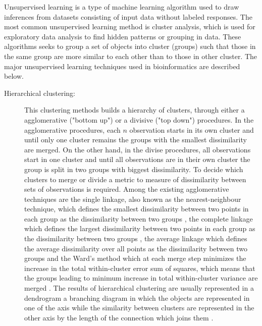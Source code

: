 Unsupervised learning is a type of machine learning algorithm used to draw inferences from datasets consisting of input data without labeled responses.
The most common unsupervised learning method is cluster analysis, which is used for exploratory data analysis to find hidden patterns or grouping in data. These algorithms seeks to group a set of objects into cluster (groups) such that those in the same group are more similar to each other than to those in other cluster.
The major unsupervised learning techniques used in bioinformatics are described below.
\begin{description}

\item[Hierarchical clustering:] {This clustering methods builds a hierarchy of clusters, through either a agglomerative ("bottom up") or a divisive ("top down") procedures.
In the agglomerative procedures, each $n$ observation starts in its own cluster and until only one cluster remains the groups with the smallest dissimilarity are merged.
On the other hand, in the divise procedures, all observations start in one cluster and until all observations are in their own cluster the group is split in two groups with biggest dissimilarity. To decide which clusters to merge or divide a metric to measure of dissimilarity between sets of observations is required.
Among the existing agglomerative techniques are the single linkage, also known as the nearest-neighbour technique, which defines the smallest dissimilarity between two points in each group as the dissimilarity between two groups \cite{florek1951liaison}, the complete linkage which defines the largest dissimilarity between two points in each group as the dissimilarity between two groups \cite{defays1977efficient}, the average linkage which defines the average dissimilarity over all points as the dissimilarity between two groups \cite{sokal1958statistical} and the Ward’s method which at each merge step minimizes the increase in the total within-cluster error sum of
squares, which means that  the groups leading to minimum increase in total within-cluster variance are merged \cite{ward1963hierarchical,everitt2011hierarchical}.
The results of hierarchical clustering are usually represented in a dendrogram a branching diagram in which the objects are represented in one of the axis while the similarity between clusters are represented in the other axis by the length of the connection which joins them \cite{manning1999foundations}.}


\end{description}
